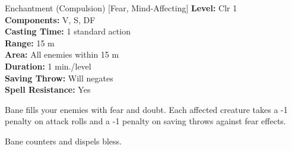 {Enchantment (Compulsion) [Fear, Mind-Affecting]}
{
	\textbf{Level:}
	Clr 1\\
	\textbf{Components:}
	V, S, DF\\
	\textbf{Casting Time:}
	1 standard action\\
	\textbf{Range:}
	15 m\\
	\textbf{Area:}
	All enemies within 15 m\\
	\textbf{Duration:}
	1 min./level\\
	\textbf{Saving Throw:}
	Will negates\\
	\textbf{Spell Resistance:}
	Yes\\
}
{
	Bane fills your enemies with fear and doubt. Each affected creature takes a -1 penalty on attack rolls and a -1 penalty on saving throws against fear effects.

	Bane counters and dispels bless.

}
